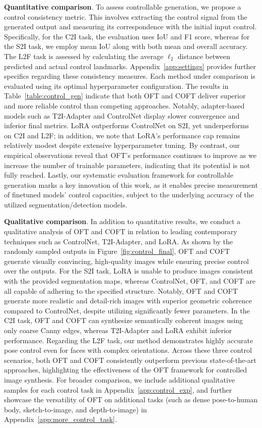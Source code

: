 \textbf{Quantitative comparison}. To assess controllable generation, we propose a control consistency metric. This involves extracting the control signal from the generated output and measuring its correspondence with the initial input control. Specifically, for the C2I task, the evaluation uses IoU and F1 score, whereas for the S2I task, we employ mean IoU along with both mean and overall accuracy. The L2F task is assessed by calculating the average $\ell_2$ distance between predicted and actual control landmarks. Appendix~\ref{app:settings} provides further specifics regarding these consistency measures. Each method under comparison is evaluated using its optimal hyperparameter configuration. The results in Table~\ref{table:control_gen} indicate that both OFT and COFT deliver superior and more reliable control than competing approaches. Notably, adapter-based models such as T2I-Adapter and ControlNet display slower convergence and inferior final metrics. LoRA outperforms ControlNet on S2I, yet underperforms on C2I and L2F; in addition, we note that LoRA’s performance cap remains relatively modest despite extensive hyperparameter tuning. By contrast, our empirical observations reveal that OFT’s performance continues to improve as we increase the number of trainable parameters, indicating that its potential is not fully reached. Lastly, our systematic evaluation framework for controllable generation marks a key innovation of this work, as it enables precise measurement of finetuned models’ control capacities, subject to the underlying accuracy of the utilized segmentation/detection models.

\textbf{Qualitative comparison}. In addition to quantitative results, we conduct a qualitative analysis of OFT and COFT in relation to leading contemporary techniques such as ControlNet, T2I-Adapter, and LoRA. As shown by the randomly sampled outputs in Figure~\ref{fig:control_final}, OFT and COFT generate visually convincing, high-quality images while ensuring precise control over the outputs. For the S2I task, LoRA is unable to produce images consistent with the provided segmentation maps, whereas ControlNet, OFT, and COFT are all capable of adhering to the specified structure. Notably, OFT and COFT generate more realistic and detail-rich images with superior geometric coherence compared to ControlNet, despite utilizing significantly fewer parameters. In the C2I task, OFT and COFT can synthesize semantically coherent images using only coarse Canny edges, whereas T2I-Adapter and LoRA exhibit inferior performance. Regarding the L2F task, our method demonstrates highly accurate pose control even for faces with complex orientations. Across these three control scenarios, both OFT and COFT consistently outperform previous state-of-the-art approaches, highlighting the effectiveness of the OFT framework for controlled image synthesis. For broader comparison, we include additional qualitative samples for each control task in Appendix~\ref{app:control_exp}, and further showcase the versatility of OFT on additional tasks (such as dense pose-to-human body, sketch-to-image, and depth-to-image) in Appendix~\ref{app:more_control_task}.

